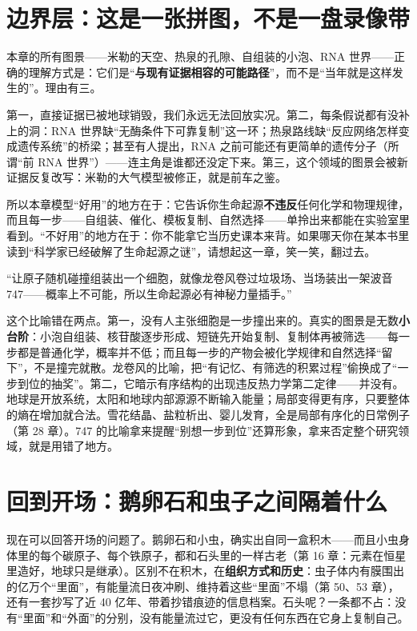 \section{边界层：这是一张拼图，不是一盘录像带}

本章的所有图景——米勒的天空、热泉的孔隙、自组装的小泡、RNA 世界——正确的理解方式是：它们是“\textbf{与现有证据相容的可能路径}”，而不是“当年就是这样发生的”。理由有三。

第一，直接证据已被地球销毁，我们永远无法回放实况。第二，每条假说都有没补上的洞：RNA 世界缺“无酶条件下可靠复制”这一环；热泉路线缺“反应网络怎样变成遗传系统”的桥梁；甚至有人提出，RNA 之前可能还有更简单的遗传分子（所谓“前 RNA 世界”）——连主角是谁都还没定下来。第三，这个领域的图景会被新证据反复改写：米勒的大气模型被修正，就是前车之鉴。

所以本章模型“好用”的地方在于：它告诉你生命起源\textbf{不违反}任何化学和物理规律，而且每一步——自组装、催化、模板复制、自然选择——单拎出来都能在实验室里看到。“不好用”的地方在于：你不能拿它当历史课本来背。如果哪天你在某本书里读到“科学家已经破解了生命起源之谜”，请想起这一章，笑一笑，翻过去。

\begin{wuqu}
“让原子随机碰撞组装出一个细胞，就像龙卷风卷过垃圾场、当场装出一架波音 747——概率上不可能，所以生命起源必有神秘力量插手。”

这个比喻错在两点。第一，没有人主张细胞是一步撞出来的。真实的图景是无数\textbf{小台阶}：小泡自组装、核苷酸逐步形成、短链先开始复制、复制体再被筛选——每一步都是普通化学，概率并不低；而且每一步的产物会被化学规律和自然选择“留下”，不是撞完就散。龙卷风的比喻，把“有记忆、有筛选的积累过程”偷换成了“一步到位的抽奖”。第二，它暗示有序结构的出现违反热力学第二定律——并没有。地球是开放系统，太阳和地球内部源源不断输入能量；局部变得更有序，只要整体的熵在增加就合法。雪花结晶、盐粒析出、婴儿发育，全是局部有序化的日常例子（第 28 章）。747 的比喻拿来提醒“别想一步到位”还算形象，拿来否定整个研究领域，就是用错了地方。
\end{wuqu}

\section{回到开场：鹅卵石和虫子之间隔着什么}

现在可以回答开场的问题了。鹅卵石和小虫，确实出自同一盒积木——而且小虫身体里的每个碳原子、每个铁原子，都和石头里的一样古老（第 16 章：元素在恒星里造好，地球只是继承）。区别不在积木，在\textbf{组织方式和历史}：虫子体内有膜围出的亿万个“里面”，有能量流日夜冲刷、维持着这些“里面”不塌（第 50、53 章），还有一套抄写了近 40 亿年、带着抄错痕迹的信息档案。石头呢？一条都不占：没有“里面”和“外面”的分别，没有能量流过它，更没有任何东西在它身上复制自己。

